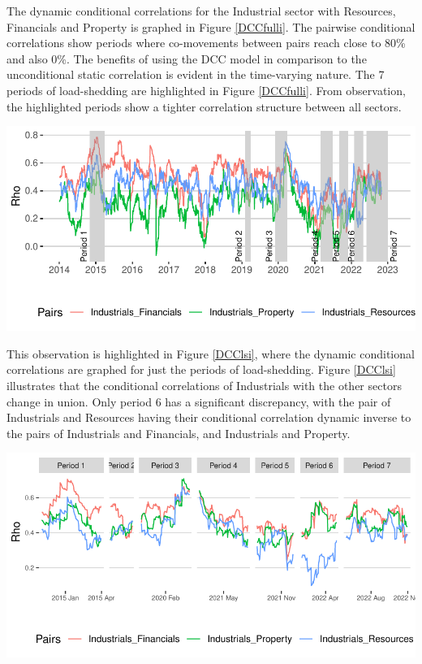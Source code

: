 \documentclass[11pt,preprint, authoryear]{elsarticle}
\let\origfigure\figure
\let\endorigfigure\endfigure
\renewenvironment{figure}[1][2] {
    \expandafter\origfigure\expandafter[H]
} {
    \endorigfigure
}
\numberwithin{equation}{section}
\numberwithin{figure}{section}
\numberwithin{table}{section}
\begin{document}
The dynamic conditional correlations for the Industrial sector with
Resources, Financials and Property is graphed in Figure \ref{DCCfulli}.
The pairwise conditional correlations show periods where co-movements
between pairs reach close to 80\% and also 0\%. The benefits of using
the DCC model in comparison to the unconditional static correlation is
evident in the time-varying nature. The 7 periods of load-shedding are
highlighted in Figure \ref{DCCfulli}. From observation, the highlighted
periods show a tighter correlation structure between all sectors.

\begin{figure}[H]

{\centering \includegraphics{Paper_files/figure-latex/DCCfulli-1} 

}

\caption{Dynamic Conditional Correlations: Industrials \label{DCCfulli}}\label{fig:DCCfulli}
\end{figure}

This observation is highlighted in Figure \ref{DCClsi}, where the
dynamic conditional correlations are graphed for just the periods of
load-shedding. Figure \ref{DCClsi} illustrates that the conditional
correlations of Industrials with the other sectors change in union. Only
period 6 has a significant discrepancy, with the pair of Industrials and
Resources having their conditional correlation dynamic inverse to the
pairs of Industrials and Financials, and Industrials and Property.

\begin{figure}[H]

{\centering \includegraphics{Paper_files/figure-latex/DCClsi-1} 

}

\caption{Load-Shedding Dynamic Conditional Correlations: Industrials \label{DCClsi}}\label{fig:DCClsi}
\end{figure}
\end{document}
